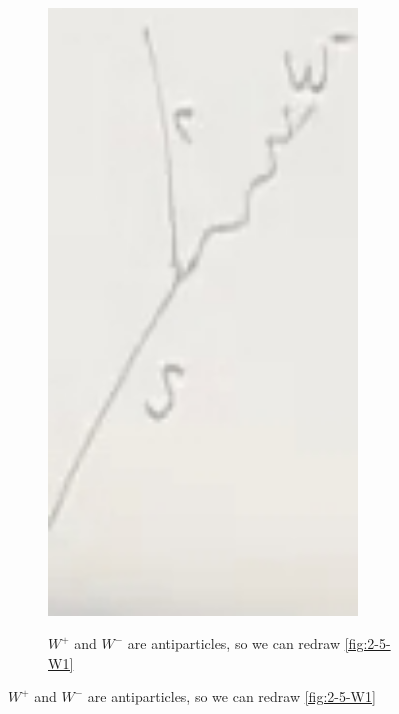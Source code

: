 \documentclass[]{article}
\begin{document}
\begin{figure}[H]
\begin{subfigure}[t]{0.2\textwidth}
		\includegraphics[width=0.9\textwidth]{2-5-W3}
	\end{subfigure}
	\begin{subfigure}[t]{0.2\textwidth}
		\caption{$W^+$ and $W^-$ are antiparticles, so we can redraw \ref{fig:2-5-W1}}

\end{subfigure}
\end{figure}
\end{document}
